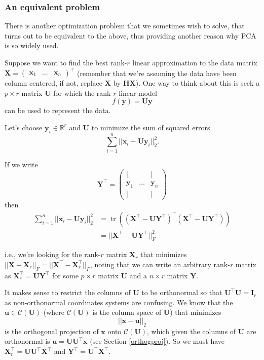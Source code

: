 \documentclass[
]{book}
\theoremstyle{definition}
\theoremstyle{definition}
\theoremstyle{definition}
\theoremstyle{definition}
\theoremstyle{remark}
\begin{document}
\hypertarget{an-equivalent-problem}{%
\subsubsection*{An equivalent problem}\label{an-equivalent-problem}}

There is another optimization problem that we sometimes wish to solve, that turns out to be equivalent to the above, thus providing another reason why PCA is so widely used.

Suppose we want to find the best rank-\(r\) linear approximation to the data matrix \(\mathbf X=\begin{pmatrix}\mathbf x_1& \ldots & \mathbf x_n\end{pmatrix}^\top\) (remember that we're assuming the data have been column centered, if not, replace \(\mathbf X\) by \(\mathbf H\mathbf X\)). One way to think about this is seek a \(p\times r\) matrix \(\mathbf U\) for which the rank \(r\) linear model
\[f(\mathbf y) = \mathbf U\mathbf y\] can be used to represent the data.

Let's choose \(\mathbf y_i\in \mathbb{R}^r\) and \(\mathbf U\) to minimize the sum of squared errors
\[\sum_{i=1}^n ||\mathbf x_i - \mathbf U\mathbf y_i||^2_2.\]

If we write
\[\mathbf Y^\top = \begin{pmatrix} 
| &&|\\
\mathbf y_1& \ldots & \mathbf y_n\\
| &&|
\end{pmatrix}\]
then
\begin{align*}
\sum_{i=1}^n ||\mathbf x_i - \mathbf U\mathbf y_i||^2_2 &=\operatorname{tr}((\mathbf X^\top - \mathbf U\mathbf Y^\top)^\top (\mathbf X^\top - \mathbf U\mathbf Y^\top))\\
&=||\mathbf X^\top - \mathbf U\mathbf Y^\top||_F^2
\end{align*}

i.e., we're looking for the rank-\(r\) matrix \(\mathbf X_r\) that minimizes \(||\mathbf X- \mathbf X_r||_F=||\mathbf X^\top - \mathbf X_r^\top||_F\), noting that we can write an arbitrary rank-\(r\) matrix as \(\mathbf X_r^\top = \mathbf U\mathbf Y^\top\) for some \(p\times r\) matrix \(\mathbf U\) and a \(n \times r\) matrix \(\mathbf Y\).

It makes sense to restrict the columns of \(\mathbf U\) to be orthonormal so that \(\mathbf U^\top \mathbf U=\mathbf I_r\) as non-orthonormal coordinates systems are confusing. We know that the \(\mathbf u\in \mathcal{C}(\mathbf U)\) (where \(\mathcal{C}(\mathbf U)\) is the column space of \(\mathbf U\)) that minimizes
\[||\mathbf x-\mathbf u||_2\]
is the orthogonal projection of \(\mathbf x\) onto \(\mathcal{C}(\mathbf U)\), which given the columns of \(\mathbf U\) are orthonormal is \(\mathbf u= \mathbf U\mathbf U^\top \mathbf x\) (see Section \ref{orthogproj}). So we must have \(\mathbf X_r^\top = \mathbf U\mathbf U^\top \mathbf X^\top\) and \(\mathbf Y^\top = \mathbf U^\top \mathbf X^\top\).
\end{document}
